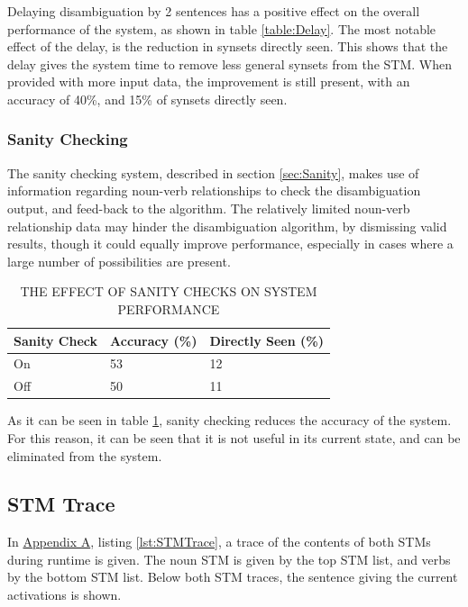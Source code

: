 \documentclass[]{article}
\begin{document}
Delaying disambiguation by 2 sentences has a positive effect on the overall performance of the system, as shown in table \ref{table:Delay}. The most notable effect of the delay, is the reduction in synsets directly seen. This shows that the delay gives the system time to remove less general synsets from the STM. When provided with more input data, the improvement is still present, with an accuracy of 40\%, and 15\% of synsets directly seen.

\subsubsection{Sanity Checking} 
\label{sec:EvDisSanity}
The sanity checking system, described in section \ref{sec:Sanity}, makes use of information regarding noun-verb relationships to check the disambiguation output, and feed-back to the algorithm. The relatively limited noun-verb relationship data may hinder the disambiguation algorithm, by dismissing valid results, though it could equally improve performance, especially in cases where a large number of possibilities are present.

\begin{table}
\begin{center}
\begin{tabular}{|p{5em}|p{7em}|p{7em}|}
	\hline
	Sanity Check & Accuracy (\%) & Directly Seen (\%) \\
	\hline
	On & 53 & 12\\
	\hline
	Off & 50 & 11\\
	\hline
\end{tabular}
\end{center}
\caption{THE EFFECT OF SANITY CHECKS ON SYSTEM PERFORMANCE}
\label{table:Sanity}
\end{table}

As it can be seen in table \ref{table:Sanity}, sanity checking reduces the accuracy of the system. For this reason, it can be seen that it is not useful in its current state, and can be eliminated from the system.

\subsection{STM Trace}
\label{sec:EvTrace}
In \hyperref[sec:AppA]{Appendix A}, listing \ref{lst:STMTrace}, a trace of the contents of both STMs during runtime is given. The noun STM is given by the top STM list, and verbs by the bottom STM list. Below both STM traces, the sentence giving the current activations is shown.
\end{document}
